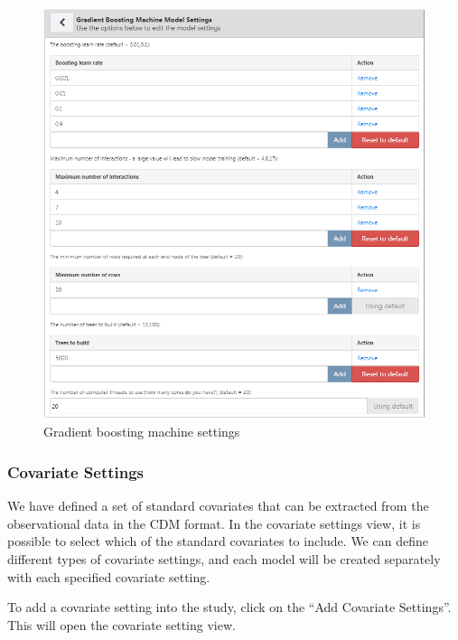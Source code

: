 \documentclass[11pt]{book}
\theoremstyle{definition}
\theoremstyle{definition}
\theoremstyle{definition}
\theoremstyle{remark}
\begin{document}
\begin{figure}

{\centering \includegraphics[width=1\linewidth]{images/PatientLevelPrediction/gbmSettings} 

}

\caption{Gradient boosting machine settings}\label{fig:gbmSettings}
\end{figure}

\subsubsection*{Covariate Settings}\label{covariate-settings-1}

We have defined a set of standard covariates that can be extracted from
the observational data in the CDM format. In the covariate settings
view, it is possible to select which of the standard covariates to
include. We can define different types of covariate settings, and each
model will be created separately with each specified covariate setting.

To add a covariate setting into the study, click on the ``Add Covariate
Settings''. This will open the covariate setting view.
\end{document}
